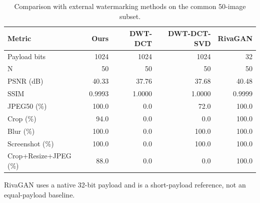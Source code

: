 \begin{table}[t]
\centering
\caption{Comparison with external watermarking methods on the common 50-image subset.}
\label{tab:external}
\begin{tabular}{l r r r r}
\toprule
Metric & Ours & DWT-DCT & DWT-DCT-SVD & RivaGAN \\
\midrule
Payload bits & 1024 & 1024 & 1024 & 32 \\
N & 50 & 50 & 50 & 50 \\
PSNR (dB) & 40.33 & 37.76 & 37.68 & 40.48 \\
SSIM & 0.9993 & 1.0000 & 1.0000 & 0.9999 \\
JPEG50 (\%) & 100.0 & 0.0 & 72.0 & 100.0 \\
Crop (\%) & 94.0 & 0.0 & 0.0 & 100.0 \\
Blur (\%) & 100.0 & 0.0 & 100.0 & 100.0 \\
Screenshot (\%) & 100.0 & 0.0 & 100.0 & 100.0 \\
Crop+Resize+JPEG (\%) & 88.0 & 0.0 & 0.0 & 100.0 \\
\bottomrule
\end{tabular}
\par\smallskip
\footnotesize RivaGAN uses a native 32-bit payload and is a short-payload reference, not an equal-payload baseline.
\end{table}
